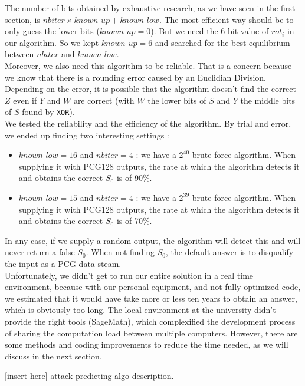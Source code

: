 \documentclass[preprint]{iacrtrans}
\begin{document}
The number of bits obtained by exhaustive research, as we have seen in the first section, is $nbiter \times known\_up + known\_low$. The most efficient way should be to only guess the lower bits ($known\_up = 0$). But we need the 6 bit value of $rot_i$ in our algorithm. So we kept $known\_up = 6$ and searched for the best equilibrium between $nbiter$ and $known\_low$. \\ 

Moreover, we also need this algorithm to be reliable. That is a concern because we know that there is a rounding error caused by an Euclidian Division. Depending on the error, it is possible that the algorithm doesn't find the correct $Z$ even if $Y$ and $W$ are correct (with $W$ the lower bits of $S$ and $Y$ the middle bits of $S$ found by \texttt{XOR}). \\

We tested the reliability and the efficiency of the algorithm. By trial and error, we ended up finding two interesting settings :
\begin{itemize}
    \item $known\_low = 16$ and $nbiter = 4$ : we have a $2^{40}$ brute-force algorithm. When supplying it with PCG128 outputs, the rate at which the algorithm detects it and obtains the correct $S_0$ is of 90\%.
    \item $known\_low = 15$ and $nbiter = 4$ : we have a $2^{39}$ brute-force algorithm. When supplying it with PCG128 outputs, the rate at which the algorithm detects it and obtains the correct $S_0$ is of 70\%.
\end{itemize}

In any case, if we supply a random output, the algorithm will detect this and will never return a false $S_0$. When not finding $S_0$, the default answer is to disqualify the input as a PCG data steam.\\

Unfortunately, we didn't get to run our entire solution in a real time environment, because with our personal equipment, and not fully optimized code, we estimated that it would have take more or less ten years to obtain an answer, which is obviously too long.
The local environment at the university didn't provide the right tools (SageMath), which complexified the development process of sharing the computation load between multiple computers. However, there are some methods and coding improvements to reduce the time needed, as we will discuss in the next section.

[insert here] attack predicting algo description.
\end{document}
